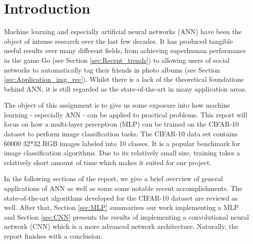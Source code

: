 \section{Introduction}
    \pagestyle{tom}

Machine learning and especially artificial neural networks (ANN) have been the object of intense research over the last few decades. It has produced tangible useful results over many different fields, from achieving superhuman performance in the game Go (see Section \ref{sec:Recent_trends}) to allowing users of social networks to automatically tag their friends in photo albums (see Section \ref{sec:Application_img_rec}). Whilst there is a lack of the theoretical foundations behind ANN, it is still regarded as the state-of-the-art in many application areas.

The object of this assignment is to give us some exposure into how machine learning - especially ANN - can be applied to practical problems. This report will focus on how a multi-layer perceptron (MLP) can be trained on the CIFAR-10 dataset to perform image classification tasks. The CIFAR-10 data set contains 60000 32*32 RGB images labeled into 10 classes. It is a popular benchmark for image classification algorithms. Due to its relatively small size, training takes a relatively short amount of time which makes it suited for our project.

In the following sections of the report, we give a brief overview of general applications of ANN as well as some some notable recent accomplishments. The state-of-the-art algorithms developed for the CIFAR-10 dataset are reviewd as well. After that, Section \ref{sec:MLP} summarizes our work implementing a MLP and Section \ref{sec:CNN} presents the results of implementing a convolutional neural network (CNN) which is a more advanced network architecture. Naturally, the report finishes with a conclusion.

